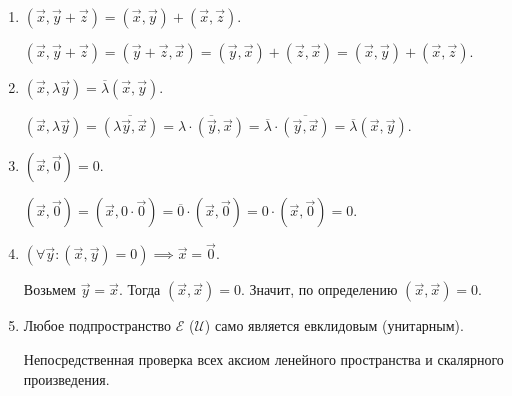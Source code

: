 \begin{enumerate}[label={\arabic*°.}]
    \item $(\vec{x}, \vec{y} + \vec{z}) = (\vec{x}, \vec{y}) + (\vec{x}, \vec{z}).$
    
    $(\vec{x}, \vec{y} + \vec{z}) = (\vec{y} + \vec{z}, \vec{x}) = (\vec{y}, \vec{x}) + (\vec{z}, \vec{x}) = (\vec{x}, \vec{y}) + (\vec{x}, \vec{z}).$
    
    \item $(\vec{x}, \lambda \vec{y}) = \overline{\lambda}(\vec{x}, \vec{y}).$

    $(\vec{x}, \lambda \vec{y}) = \overline{(\lambda \vec{y}, \vec{x})} = \overline{\lambda \cdot (\vec{y}, \vec{x})} = \overline{\lambda} \cdot \overline{(\vec{y}, \vec{x})} = \overline{\lambda} (\vec{x}, \vec{y}).$
    
    \item $(\vec{x}, \vec{0}) = 0.$

    $(\vec{x}, \vec{0}) = (\vec{x}, 0 \cdot \vec{0}) = \overline{0} \cdot (\vec{x}, \vec{0}) = 0 \cdot (\vec{x}, \vec{0}) = 0.$
    
    \item $(\forall \vec{y} \colon(\vec{x}, \vec{y}) = 0 )\implies \vec{x} = \vec{0}.$
    
    Возьмем $\vec{y} = \vec{x}$. Тогда $(\vec{x}, \vec{x}) = 0$. Значит, по определению $(\vec{x}, \vec{x}) = 0$.
    
    \item Любое подпространство $\mathcal{E}$ ($\mathcal{U}$) само является евклидовым (унитарным).
    
    Непосредственная проверка всех аксиом ленейного пространства и скалярного произведения.
\end{enumerate}
